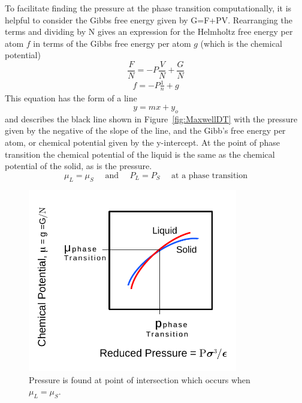 \documentclass[double,12pt]{beavtex}
\begin{document}
To facilitate finding the pressure at the phase transition computationally, 
it is helpful to consider the Gibbs free energy given by G=F+PV. 
Rearranging the terms and dividing by N gives an  expression for the 
Helmholtz free energy per atom $f$ in terms of the Gibbs free energy 
per atom  $g$ (which is the chemical potential)  
\begin{equation}\frac{F}{N} = -P\frac{V}{N}+\frac{G}{N} \end{equation}
\begin{align}f=-P\frac{1}{n}+g\end{align}
This equation has the form of a line
\begin{equation}
    y=mx+y_o
\end{equation}
and describes the black line shown in Figure~\ref{fig:MaxwellDT} with the 
pressure given by the negative of the slope of the line, and the Gibb's 
free energy per atom, or chemical potential given by the y-intercept. 
At the point of phase transition the chemical potential of the liquid is 
the same as the chemical potential of the solid, as is the pressure.
\begin{equation}
    \mu_L=\mu_S\mbox{~~~~and~~~~}P_L=P_S\mbox{~~~~at a phase transition}
\end{equation} 

 \begin{figure}
    \centering
     \includegraphics[height=8cm]{figs/MaxwellDTC-Fig2.pdf}
    \caption{Pressure is found at point of intersection which occurs 
    when $\mu_L=\mu_S$.}
    \label{fig:GibbsvsP}
  \end{figure}
  
\end{document}
